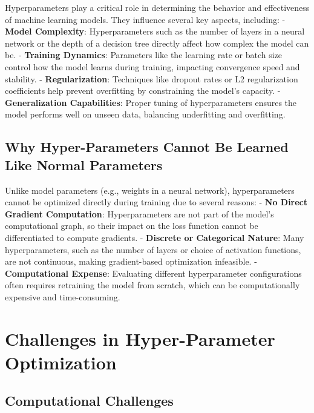 \documentclass[
  letterpaper,
  DIV=11,
  numbers=noendperiod]{scrreprt}
\begin{document}
Hyperparameters play a critical role in determining the behavior and
effectiveness of machine learning models. They influence several key
aspects, including: - \textbf{Model Complexity}: Hyperparameters such as
the number of layers in a neural network or the depth of a decision tree
directly affect how complex the model can be. - \textbf{Training
Dynamics}: Parameters like the learning rate or batch size control how
the model learns during training, impacting convergence speed and
stability. - \textbf{Regularization}: Techniques like dropout rates or
L2 regularization coefficients help prevent overfitting by constraining
the model's capacity. - \textbf{Generalization Capabilities}: Proper
tuning of hyperparameters ensures the model performs well on unseen
data, balancing underfitting and overfitting.

\subsection{Why Hyper-Parameters Cannot Be Learned Like Normal
Parameters}\label{why-hyper-parameters-cannot-be-learned-like-normal-parameters}

Unlike model parameters (e.g., weights in a neural network),
hyperparameters cannot be optimized directly during training due to
several reasons: - \textbf{No Direct Gradient Computation}:
Hyperparameters are not part of the model's computational graph, so
their impact on the loss function cannot be differentiated to compute
gradients. - \textbf{Discrete or Categorical Nature}: Many
hyperparameters, such as the number of layers or choice of activation
functions, are not continuous, making gradient-based optimization
infeasible. - \textbf{Computational Expense}: Evaluating different
hyperparameter configurations often requires retraining the model from
scratch, which can be computationally expensive and time-consuming.

\section{Challenges in Hyper-Parameter
Optimization}\label{challenges-in-hyper-parameter-optimization}

\subsection{Computational Challenges}\label{computational-challenges-1}
\end{document}
